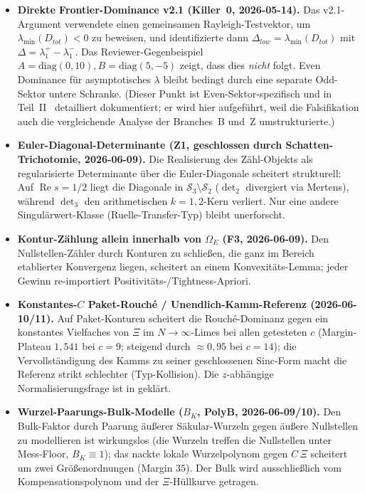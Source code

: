 \documentclass[12pt,a4paper]{article}
\theoremstyle{definition}
\theoremstyle{remark}
\begin{document}
\begin{itemize}
  \item \textbf{Direkte Frontier-Dominance v2.1 (Killer~0, 2026-05-14).}
    Das v2.1-Argument verwendete einen gemeinsamen Rayleigh-Testvektor,
    um $\lambda_{\min}(D_{tot})<0$ zu beweisen, und identifizierte dann
    $\Delta_{low}=\lambda_{\min}(D_{tot})$ mit
    $\Delta=\lambda_1^+-\lambda_1^-$. Das Reviewer-Gegenbeispiel
    $A=\mathrm{diag}(0,10), B=\mathrm{diag}(5,-5)$ zeigt, dass dies
    \emph{nicht} folgt. Even Dominance für asymptotisches $\lambda$
    bleibt bedingt durch eine separate Odd-Sektor untere Schranke.
    (Dieser Punkt ist Even-Sektor-spezifisch und in
    Teil~II~\cite{Geiger2026partII} detailliert dokumentiert; er wird
    hier aufgeführt, weil die Falsifikation auch die vergleichende
    Analyse der Branches~B und~Z umstrukturierte.)

  \item \textbf{Euler-Diagonal-Determinante (Z1, geschlossen durch
    Schatten-Trichotomie, 2026-06-09).} Die Realisierung des
    Zähl-Objekts als regularisierte Determinante über die
    Euler-Diagonale scheitert strukturell: Auf
    $\operatorname{Re} s = 1/2$ liegt die Diagonale in
    $\mathcal{S}_3\setminus\mathcal{S}_2$ ($\det_2$ divergiert via
    Mertens), während $\det_3$ den arithmetischen $k=1,2$-Kern verliert.
    Nur eine andere Singulärwert-Klasse (Ruelle-Transfer-Typ) bleibt
    unerforscht.

  \item \textbf{Kontur-Zählung allein innerhalb von $\Omega_E$ (F3,
    2026-06-09).} Den Nullstellen-Zähler durch Konturen zu schließen,
    die ganz im Bereich etablierter Konvergenz liegen, scheitert an
    einem Konvexitäts-Lemma; jeder Gewinn re-importiert
    Positivitäts-/Tightness-Apriori.

  \item \textbf{Konstantes-$C$ Paket-Rouch\'e / Unendlich-Kamm-Referenz
    (2026-06-10/11).} Auf Paket-Konturen scheitert die
    Rouch\'e-Dominanz gegen ein konstantes Vielfaches von $\Xi$ im
    $N\to\infty$-Limes bei allen getesteten $c$ (Margin-Plateau
    $1{,}541$ bei $c=9$; steigend durch $\approx 0{,}95$ bei $c=14$);
    die Vervollständigung des Kamms zu seiner geschlossenen Sinc-Form
    macht die Referenz strikt schlechter (Typ-Kollision). Die
    $z$-abhängige Normalisierungsfrage ist in 
    geklärt.

  \item \textbf{Wurzel-Paarungs-Bulk-Modelle ($B_K$, PolyB,
    2026-06-09/10).} Den Bulk-Faktor durch Paarung äußerer
    Säkular-Wurzeln gegen äußere Nullstellen zu modellieren ist
    wirkungslos (die Wurzeln treffen die Nullstellen unter Mess-Floor,
    $B_K \equiv 1$); das nackte lokale Wurzelpolynom gegen $C\,\Xi$
    scheitert um zwei Größenordnungen (Margin $35$). Der Bulk wird
    ausschließlich vom Kompensationspolynom und der $\Xi$-Hüllkurve
    getragen.
\end{itemize}
\end{document}
